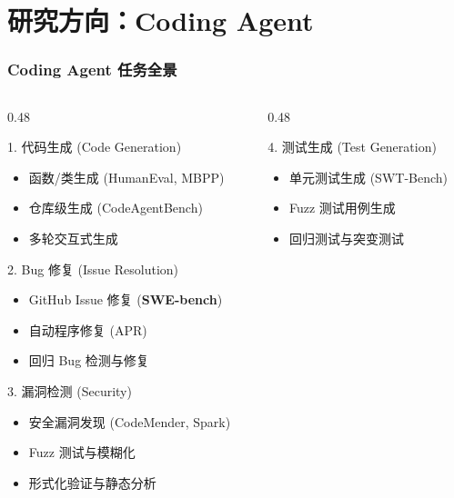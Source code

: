 \documentclass[aspectratio=169,10pt]{beamer}
\begin{document}
\section{研究方向：Coding Agent}

\begin{frame}
  \frametitle{Coding Agent 任务全景}

  \small
  \begin{columns}[T]
    \begin{column}{0.48\textwidth}
      \begin{block}{1. 代码生成 (Code Generation)}
        \begin{itemize}
          \item 函数/类生成 (HumanEval, MBPP)
          \item 仓库级生成 (CodeAgentBench)
          \item 多轮交互式生成
        \end{itemize}
      \end{block}

      \begin{block}{2. Bug 修复 (Issue Resolution)}
        \begin{itemize}
          \item GitHub Issue 修复 (\textbf{SWE-bench})
          \item 自动程序修复 (APR)
          \item 回归 Bug 检测与修复
        \end{itemize}
      \end{block}

      \begin{block}{3. 漏洞检测 (Security)}
        \begin{itemize}
          \item 安全漏洞发现 (CodeMender, Spark)
          \item Fuzz 测试与模糊化
          \item 形式化验证与静态分析
        \end{itemize}
      \end{block}
    \end{column}

    \begin{column}{0.48\textwidth}
      \begin{block}{4. 测试生成 (Test Generation)}
        \begin{itemize}
          \item 单元测试生成 (SWT-Bench)
          \item Fuzz 测试用例生成
          \item 回归测试与突变测试
        \end{itemize}
      \end{block}


\end{column}
\end{columns}
\end{frame}
\end{document}
